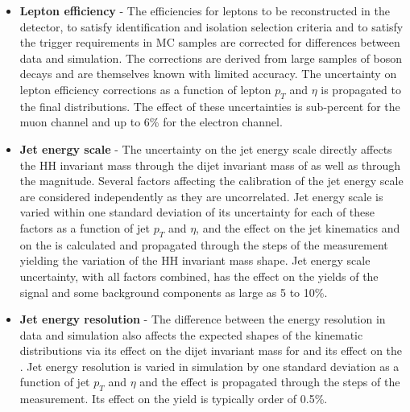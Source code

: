 \begin{itemize}

\item{\bf Lepton efficiency} - The efficiencies for leptons to be
  reconstructed in the detector, to satisfy identification and isolation selection
  criteria and to satisfy the trigger requirements in MC samples are corrected for
  differences between data and simulation. The corrections are derived
  from large samples of \PZ boson decays and are themselves known with
  limited accuracy. The uncertainty on lepton efficiency corrections
  as a function of lepton $p_T$ and $\eta$ is propagated to the final \mTHH distributions.
  The effect of these uncertainties is sub-percent for the muon
  channel and up to 6\% for the electron channel.

\item{\bf Jet energy scale} - The uncertainty on the jet energy scale
  directly affects the HH invariant mass through the dijet invariant
  mass of \Hbb as well as through the \ETslash magnitude. Several
  factors affecting the calibration of the jet energy scale are
  considered independently as they are uncorrelated. Jet energy scale
  is varied within one standard deviation of its uncertainty for each
  of these factors as a function of jet $p_T$ and $\eta$, and the
  effect on the jet kinematics and on the \ETslash is calculated and
  propagated through the steps of the measurement yielding the
  variation of the HH invariant mass shape.  Jet energy scale
  uncertainty, with all factors combined, has the effect on the yields
  of the signal and some background components as large as 5 to 10\%.

\item{\bf Jet energy resolution} - The difference between the energy
  resolution in data and simulation also affects the expected shapes
  of the kinematic distributions via its effect on the dijet invariant
  mass for \Hbb and its effect on the \ETslash. Jet energy resolution
  is varied in simulation by one standard deviation as a function of
  jet $p_T$ and $\eta$ and the effect is propagated through the steps
  of the measurement. Its effect on the \mTHH yield is typically order of 0.5\%.


\end{itemize}
